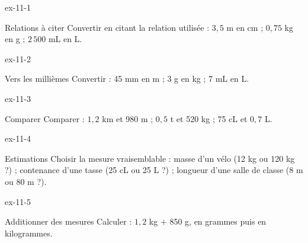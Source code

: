 \clearpage{}
\begin{blocLivre}{ex-11-1}\begin{exercice}[1]{Relations à citer}
Convertir en citant la relation utilisée : $3{,}5$ m en cm ; $0{,}75$ kg en g ; $2\,500$ mL en L.
\end{exercice}\end{blocLivre}
\begin{blocLivre}{ex-11-2}\begin{exercice}[1]{Vers les millièmes}
Convertir : 45 mm en m ; 3 g en kg ; 7 mL en L.
\end{exercice}\end{blocLivre}
\begin{blocLivre}{ex-11-3}\begin{exercice}[1]{Comparer}
Comparer : $1{,}2$ km et 980 m ; $0{,}5$ t et 520 kg ; 75 cL et $0{,}7$ L.
\end{exercice}\end{blocLivre}
\begin{blocLivre}{ex-11-4}\begin{exercice}[1]{Estimations}
Choisir la mesure vraisemblable : masse d’un vélo (12 kg ou 120 kg ?) ; contenance d’une tasse (25 cL ou 25 L ?) ; longueur d’une salle de classe (8 m ou 80 m ?).
\end{exercice}\end{blocLivre}
\begin{blocLivre}{ex-11-5}\begin{exercice}[1]{Additionner des mesures}
Calculer : $1{,}2$ kg $+$ 850 g, en grammes puis en kilogrammes.
\end{exercice}\end{blocLivre}

